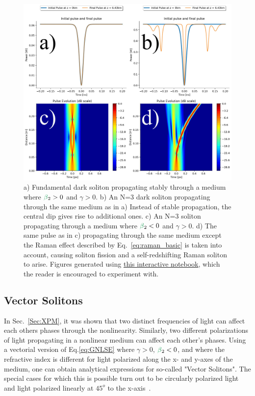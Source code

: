 \begin{figure}
    \centering
    \includegraphics[width=1\linewidth]{figures/dark_and_raman_soliton_combined.png}
    \caption{a) Fundamental dark soliton propagating stably through a medium where $\betag_2>0$ and $\gamma>0$. b) An N=3 dark soliton propagating through the same medium as in a) Instead of stable propagation, the central dip gives rise to additional ones. c) An N=3 soliton propagating through a medium where $\betag_2<0$ and $\gamma>0$. d) The same pulse as in c) propagating through the same medium except the Raman effect described by Eq.~\ref{eq:raman_basic} is taken into account, causing soliton fission and a self-redshifting Raman soliton to arise. Figures generated using \href{https://colab.research.google.com/drive/1qtMcXElXn4VBntfCgXIGGkyDfiGicElx?usp=sharing}{this interactive notebook}, which the reader is encouraged to experiment with.}
    \label{fig:dark_and_raman}
\end{figure}

\subsection{Vector Solitons}
In Sec.~\ref{Sec:XPM}, it was shown that two distinct frequencies of light can affect each others phases through the nonlinearity. Similarly, two different polarizations of light propagating in a nonlinear medium can affect each other's phases. Using a vectorial version of Eq.\ref{eq:GNLSE} where $\gamma>0$, $\betag_2<0$, and where the refractive index is different for light polarized along the x- and y-axes of the medium, one can obtain analytical expressions for so-called "Vector Solitons". The special cases for which this is possible turn out to be circularly polarized light and light polarized linearly at $45^{o}$ to the x-axis~\cite{AGRAWAL_CH6_POL}.







